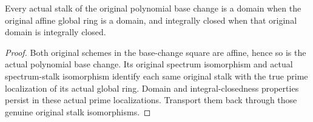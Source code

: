 \begin{theorem}
\label{thm:actual-affine-polynomial-base-change-stalk-normal}
\leanok
{}
Every actual stalk of the original polynomial base change is a domain when
the original affine global ring is a domain, and integrally closed when that
original domain is integrally closed.
\end{theorem}
\begin{proof}
Both original schemes in the base-change square are affine, hence so is the
actual polynomial base change. Its original spectrum isomorphism and actual
spectrum-stalk isomorphism identify each same original stalk with the true
prime localization of its actual global ring. Domain and integral-closedness
properties persist in these actual prime localizations. Transport them back
through those genuine original stalk isomorphisms.
\end{proof}
